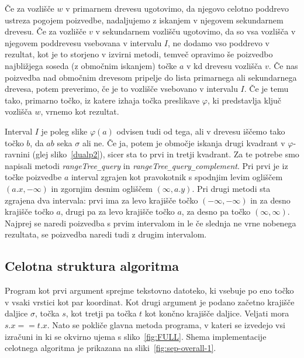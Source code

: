 \documentclass[a4paper, 12pt]{book}
\newcommand{\U}{\texttt{\_}}
\begin{document}
Če za vozlišče $w$ v primarnem drevesu ugotovimo, da njegovo celotno poddrevo ustreza pogojem poizvedbe, nadaljujemo z iskanjem v njegovem sekundarnem drevesu. Če za vozlišče $v$ v sekundarnem vozlišču ugotovimo, da so vsa vozlišča v njegovem poddrevesu vsebovana v intervalu $I$, ne dodamo vso poddrevo v rezultat, kot je to storjeno v izvirni metodi, temveč opravimo še poizvedbo najbližjega soseda (z območnim iskanjem) točke $a$ v kd drevesu vozlišča $v$. Če nas poizvedba nad območnim drevesom pripelje do lista primarnega ali sekundarnega drevesa, potem preverimo, če je to vozlišče vsebovano v intervalu $I$. Če je temu tako, primarno točko, iz katere izhaja točka preslikave $\varphi$, ki predstavlja ključ vozlišča $w$, vrnemo kot rezultat.

Interval $I$ je poleg slike $\varphi (a)$ odvisen tudi od tega, ali v drevesu iščemo tako točko $b$, da $ab$ seka $\sigma$ ali ne. Če ja, potem je območje iskanja drugi kvadrant v $\varphi$-ravnini (glej sliko~\ref{dualp2}), sicer sta to prvi in tretji kvadrant. Za te potrebe smo napisali metodi \textit{rangeTree\U query} in \textit{rangeTree\U query\U complement}. Pri prvi je iz točke poizvedbe $a$ interval zgrajen kot pravokotnik s spodnjim levim ogliščem $(a.x, -\infty)$ in zgornjim desnim ogliščem $(\infty, a.y)$. Pri drugi metodi sta zgrajena dva intervala: prvi ima za levo krajišče točko $(-\infty, -\infty)$ in za desno krajišče točko $a$, drugi pa za levo krajišče točko $a$, za desno pa točko $(\infty, \infty)$. Najprej se naredi poizvedba s prvim intervalom in le če slednja ne vrne nobenega rezultata, se poizvedba naredi tudi z drugim intervalom.

\subsection{Celotna struktura algoritma}

Program kot prvi argument sprejme tekstovno datoteko, ki vsebuje po eno točko v vsaki vrstici kot par koordinat. Kot drugi argument je podano začetno krajišče daljice $\sigma$, točka $s$, kot tretji pa točka $t$ kot končno krajišče daljice. Veljati mora $s.x == t.x$. Nato se pokliče glavna metoda programa, v kateri se izvedejo vsi izračuni in ki se okvirno ujema s sliko~\ref{fig:FULL}. Shema implementacije celotnega algoritma je prikazana na sliki~\ref{fig:sep-overall-1}.
\end{document}
